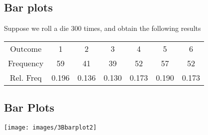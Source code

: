 \documentclass[]{report}
\begin{document}
\subsection{Bar plots}
\large
Suppose we roll a die 300 times, and obtain the following results

\begin{center}
\begin{tabular}{|c|c|c|c|c|c|c|}
\hline

Outcome & 1 & 2 & 3 & 4 & 5 & 6 \\
Frequency & 59 &41 &39 &52 &57 &52  \\
Rel. Freq & 0.196 & 0.136 & 0.130 & 0.173 & 0.190 & 0.173\\
\hline
\end{tabular}
\end{center}


{
\subsection{Bar Plots}

\begin{center}
\texttt{[image: images/3Bbarplot2]}
\end{center}
}


\end{document}
